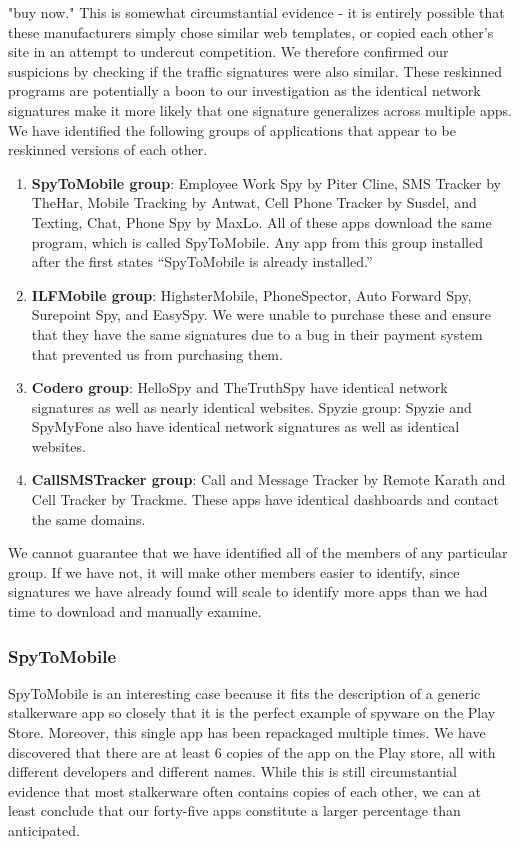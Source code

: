 \documentclass[acmtog]{acmart}
\begin{document}
"buy now." This is somewhat circumstantial evidence - it is entirely possible 
that these manufacturers simply chose similar web templates, or copied each 
other's site in an attempt to undercut competition. We therefore confirmed our 
suspicions by checking if the traffic signatures were also similar. These 
reskinned programs are potentially a boon to 
our investigation as the identical network signatures make it more likely that 
one signature generalizes across multiple apps. We have identified the 
following groups of applications that appear to be reskinned versions of each 
other.
\begin{enumerate}
	\item \textbf{SpyToMobile group}: Employee Work Spy by Piter Cline, SMS 
	Tracker by TheHar, Mobile Tracking by Antwat, Cell Phone Tracker by Susdel, 
	and Texting, Chat, 
	Phone Spy by MaxLo. All of these apps download the same program, which is 
	called SpyToMobile. Any app from this group installed after the first 
	states ``SpyToMobile is already installed.''
	\item \textbf{ILFMobile group}: HighsterMobile, PhoneSpector, Auto Forward 
	Spy, Surepoint Spy, and EasySpy. We were unable to purchase these and 
	ensure that they have the same signatures due to a bug in their payment 
	system that prevented us from purchasing them.
	\item \textbf{Codero group}: HelloSpy and TheTruthSpy have identical 
	network signatures as well as nearly identical websites.
	Spyzie group: Spyzie and SpyMyFone also have identical network signatures 
	as well as identical websites.
	\item \textbf{CallSMSTracker group}: Call and Message Tracker by Remote 
	Karath and Cell Tracker by Trackme. These apps have identical dashboards 
	and contact the same domains.
\end{enumerate}
We cannot guarantee that we have identified all of the members of any 
particular group. If we have not, it will make other members easier to 
identify, since signatures we have already found will scale to identify more 
apps than we had time to download and manually examine.

\subsubsection{SpyToMobile}
SpyToMobile is an interesting case 
because it fits the description of a generic stalkerware app so closely that it 
is the perfect example of spyware on the Play Store. Moreover, this single app 
has been repackaged multiple times. We have discovered that there are at least 
6 copies of the app on the Play store, all with different developers and 
different names. While this is still circumstantial evidence that most 
stalkerware often contains copies of each other, we can at least conclude that 
our forty-five apps constitute a larger percentage than anticipated.
\end{document}
